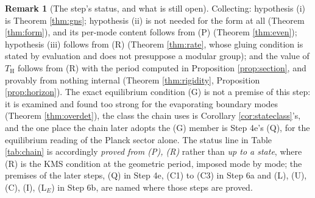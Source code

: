 \documentclass[11pt]{article}
\theoremstyle{definition}
\newtheorem{remark}[theorem]{Remark}
\renewcommand{\TH}{T_{\mathrm{H}}} %
\begin{document}
\begin{remark}[The step's status, and what is still open]\label{rem:selectstatus}
Collecting: hypothesis (i) is Theorem \ref{thm:gns}; hypothesis (ii) is not needed for the form at all (Theorem \ref{thm:form}), and its per-mode content follows from (P) (Theorem \ref{thm:even}); hypothesis (iii) follows from (R) (Theorem \ref{thm:rate}, whose gluing condition is stated by evaluation and does not presuppose a modular group); and the value of $\TH$ follows from (R) with the period computed in Proposition \ref{prop:section}, and provably from nothing internal (Theorem \ref{thm:rigidity}, Proposition \ref{prop:horizon}). The exact equilibrium condition (G) is not a premise of this step: it is examined and found too strong for the evaporating boundary modes (Theorem \ref{thm:overdet}), the class the chain uses is Corollary \ref{cor:stateclass}'s, and the one place the chain later adopts the (G) member is Step 4e's (Q), for the equilibrium reading of the Planck sector alone. The status line in Table \ref{tab:chain} is accordingly \emph{proved from (P), (R)} rather than \emph{up to a state}, where (R) is the KMS condition at the geometric period, imposed mode by mode; the premises of the later steps, (Q) in Step 4e, (C1) to (C3) in Step 6a and (L), (U), (C), (I), (L$_E$) in Step 6b, are named where those steps are proved.


\end{remark}
\end{document}
